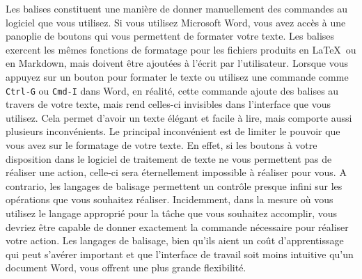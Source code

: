 \documentclass[
  letterpaper,
  DIV=11,
  numbers=noendperiod]{scrreprt}
\begin{document}
Les balises constituent une manière de donner manuellement des commandes
au logiciel que vous utilisez. Si vous utilisez Microsoft Word, vous
avez accès à une panoplie de boutons qui vous permettent de formater
votre texte. Les balises exercent les mêmes fonctions de formatage pour
les fichiers produits en \LaTeX~ou en Markdown, mais doivent être
ajoutées à l'écrit par l'utilisateur. Lorsque vous appuyez sur un bouton
pour formater le texte ou utilisez une commande comme \texttt{Ctrl-G} ou
\texttt{Cmd-I} dans Word, en réalité, cette commande ajoute des balises
au travers de votre texte, mais rend celles-ci invisibles dans
l'interface que vous utilisez. Cela permet d'avoir un texte élégant et
facile à lire, mais comporte aussi plusieurs inconvénients. Le principal
inconvénient est de limiter le pouvoir que vous avez sur le formatage de
votre texte. En effet, si les boutons à votre disposition dans le
logiciel de traitement de texte ne vous permettent pas de réaliser une
action, celle-ci sera éternellement impossible à réaliser pour vous. A
contrario, les langages de balisage permettent un contrôle presque
infini sur les opérations que vous souhaitez réaliser. Incidemment, dans
la mesure où vous utilisez le langage approprié pour la tâche que vous
souhaitez accomplir, vous devriez être capable de donner exactement la
commande nécessaire pour réaliser votre action. Les langages de
balisage, bien qu'ils aient un coût d'apprentissage qui peut s'avérer
important et que l'interface de travail soit moins intuitive qu'un
document Word, vous offrent une plus grande flexibilité.
\end{document}
